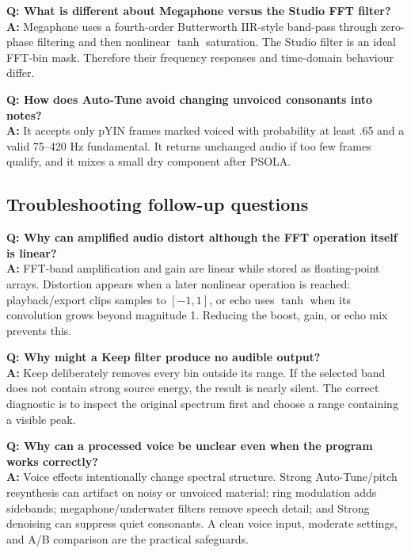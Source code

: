 \documentclass[11pt,a4paper]{article}
\begin{document}
\textbf{Q: What is different about Megaphone versus the Studio FFT filter?}\\
\textbf{A:} Megaphone uses a fourth-order Butterworth IIR-style band-pass through zero-phase filtering and then nonlinear \(\tanh\) saturation. The Studio filter is an ideal FFT-bin mask. Therefore their frequency responses and time-domain behaviour differ.

\textbf{Q: How does Auto-Tune avoid changing unvoiced consonants into notes?}\\
\textbf{A:} It accepts only pYIN frames marked voiced with probability at least .65 and a valid 75--420 Hz fundamental. It returns unchanged audio if too few frames qualify, and it mixes a small dry component after PSOLA.

\subsection*{Troubleshooting follow-up questions}
\textbf{Q: Why can amplified audio distort although the FFT operation itself is linear?}\\
\textbf{A:} FFT-band amplification and gain are linear while stored as floating-point arrays. Distortion appears when a later nonlinear operation is reached: playback/export clips samples to \([-1,1]\), or echo uses \(\tanh\) when its convolution grows beyond magnitude 1. Reducing the boost, gain, or echo mix prevents this.

\textbf{Q: Why might a Keep filter produce no audible output?}\\
\textbf{A:} Keep deliberately removes every bin outside its range. If the selected band does not contain strong source energy, the result is nearly silent. The correct diagnostic is to inspect the original spectrum first and choose a range containing a visible peak.

\textbf{Q: Why can a processed voice be unclear even when the program works correctly?}\\
\textbf{A:} Voice effects intentionally change spectral structure. Strong Auto-Tune/pitch resynthesis can artifact on noisy or unvoiced material; ring modulation adds sidebands; megaphone/underwater filters remove speech detail; and Strong denoising can suppress quiet consonants. A clean voice input, moderate settings, and A/B comparison are the practical safeguards.
\end{document}
